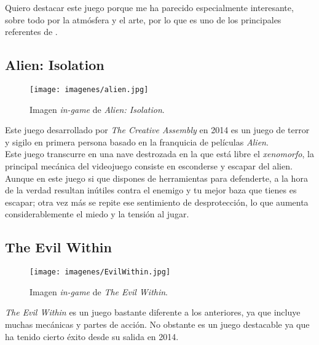 Quiero destacar este juego porque me ha parecido especialmente interesante, sobre todo por la atmósfera y el arte, por lo que es uno de los principales referentes de \textbf{\nombreJuego}.
\\

\subsection{Alien: Isolation}

\begin{figure}
	\begin{center}
		\texttt{[image: imagenes/alien.jpg]}
		\caption{Imagen \textit{in-game} de \textit{Alien: Isolation}.}
		\label{alien}
	\end{center}
\end{figure}

Este juego desarrollado por \textit{The Creative Assembly} en 2014 es un juego de terror y sigilo en primera persona basado en la franquicia de películas \textit{Alien}.
\\

Este juego transcurre en una nave destrozada en la que está libre el \textit{xenomorfo}, la principal mecánica del videojuego consiste en esconderse y escapar del alien. 
\\

Aunque en este juego si que dispones de herramientas para defenderte, a la hora de la verdad resultan inútiles contra el enemigo y tu mejor baza que tienes es escapar; otra vez más se repite ese sentimiento de desprotección, lo que aumenta considerablemente el miedo y la tensión al jugar.

\subsection{The Evil Within}

\begin{figure}
	\begin{center}
		\texttt{[image: imagenes/EvilWithin.jpg]}
		\caption{Imagen \textit{in-game} de \textit{The Evil Within}.}
		\label{EvilWithin}
	\end{center}
\end{figure}

\textit{The Evil Within} es un juego bastante diferente a los anteriores, ya que incluye muchas mecánicas y partes de acción. No obstante es un juego destacable ya que ha tenido cierto éxito desde su salida en 2014.
\\

